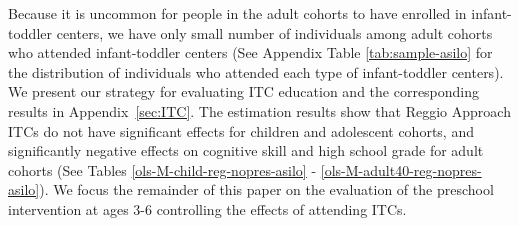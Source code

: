 Because it is uncommon for people in the adult cohorts to have enrolled in infant-toddler centers, we have only small number of individuals among adult cohorts who attended infant-toddler centers (See Appendix Table \ref{tab:sample-asilo} for the distribution of individuals who attended each type of infant-toddler centers). We present our strategy for evaluating ITC education and the corresponding results in Appendix~\ref{sec:ITC}.
The estimation results show that Reggio Approach ITCs do not have significant effects for children and adolescent cohorts, and significantly negative effects on cognitive skill and high school grade for adult cohorts (See Tables \ref{ols-M-child-reg-nopres-asilo} - \ref{ols-M-adult40-reg-nopres-asilo}). We focus the remainder of this paper on the evaluation of the preschool intervention at ages 3-6 controlling the effects of attending ITCs. 
%
